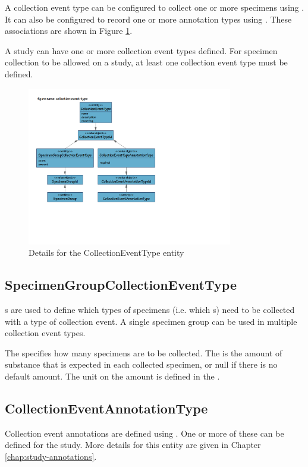 A collection event type can be configured to collect one or more specimens using
. It can also be configured to
record one or more annotation types using
. These associations are shown in
Figure \ref{fig:collection-event-type}.

A study can have one or more collection event types defined. For specimen
collection to be allowed on a study, at least one collection event type must be
defined.

\begin{figure}[H]
  \centering
  \includegraphics[trim={9mm 56mm 96mm 18mm}, clip,
    width=0.8\textwidth]{images/collection-event-type}
  \caption{Details for the CollectionEventType entity}
  \label{fig:collection-event-type}
\end{figure}

\subsection*{SpecimenGroupCollectionEventType}

s are used to define which types
of specimens (i.e. which s) need to be collected with
a type of collection event. A single specimen group can be used in multiple
collection event types.

The  specifies how many specimens are to be collected. The
 is the amount of substance that is expected in each collected
specimen, or null if there is no default amount. The unit on the amount is
defined in the .

\subsection*{CollectionEventAnnotationType}
Collection event annotations are defined using
. One or more of these can be
defined for the study. More details for this entity are given in Chapter
\ref{chap:study-annotations}.


